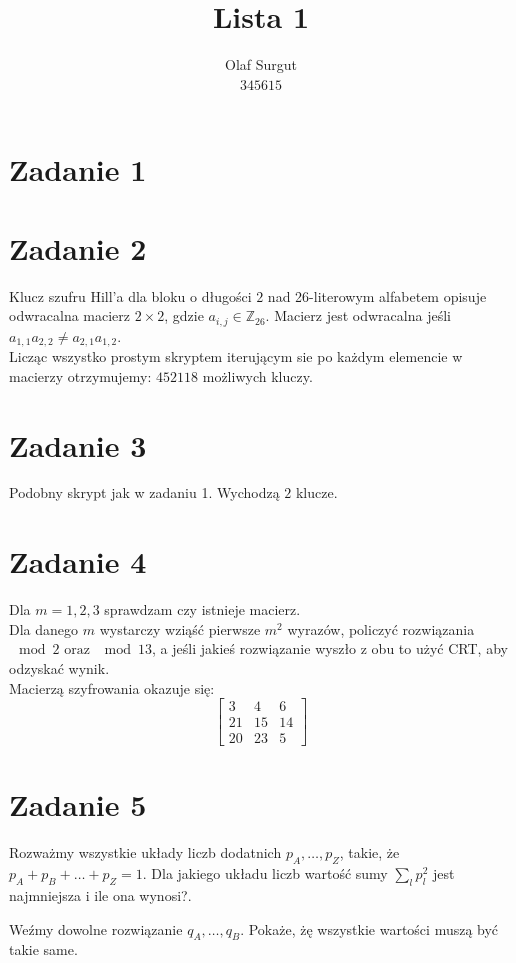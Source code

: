 \documentclass[11pt]{article}
\title{\vspace*{-0.75in}\textbf{Lista 1}}
\author{Olaf Surgut \\ $345615$}
\begin{document}
\pagestyle{empty}
\maketitle
\thispagestyle{empty}

\section*{Zadanie 1}

\section*{Zadanie 2}
Klucz szufru Hill'a dla bloku o długości $2$ nad 26-literowym alfabetem opisuje odwracalna macierz $2\times2$, gdzie $a_{i,j} \in \mathbb{Z}_{26}$. Macierz jest odwracalna jeśli $a_{1,1}a_{2,2}\neq a_{2,1}a_{1,2}$.\\
Licząc wszystko prostym skryptem iterującym sie po każdym elemencie w macierzy otrzymujemy: $452118$ możliwych kluczy.

\section*{Zadanie 3}
Podobny skrypt jak w zadaniu 1. Wychodzą $2$ klucze.

\section*{Zadanie 4}
Dla $m = 1,2,3$ sprawdzam czy istnieje macierz. \\
Dla danego $m$ wystarczy wziąść pierwsze $m^2$ wyrazów, policzyć rozwiązania $\mod 2 \text{ oraz } \mod 13$, a jeśli jakieś rozwiązanie wyszło z obu to użyć CRT, aby odzyskać wynik.\\
Macierzą szyfrowania okazuje się:\\
\[
\begin{bmatrix}
3&4&6\\
21&15&14\\
20&23&5
\end{bmatrix}\]

\section*{Zadanie 5}
Rozważmy wszystkie układy liczb dodatnich $p_A, \ldots, p_Z$, takie, że $p_A + p_B + \ldots + p_Z = 1$. Dla jakiego układu liczb wartość sumy $\sum_{l} p_l^2$ jest najmniejsza i ile ona wynosi?.

Weźmy dowolne rozwiązanie $q_A, \ldots, q_B$. Pokaże, żę wszystkie wartości muszą być takie same.
\end{document}
